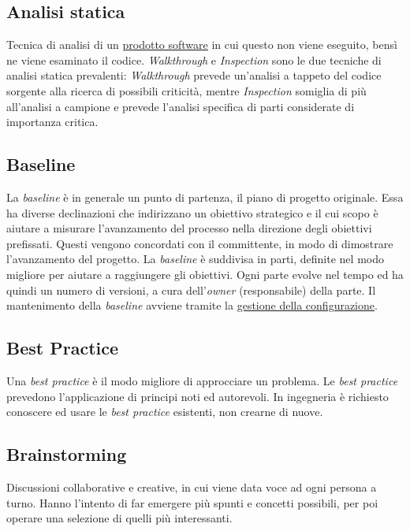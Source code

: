 	\subsection{Analisi statica}
	\label{sec:analisistatica}
	Tecnica di analisi di un \underline{\hyperref[sec:prodottosoftware]{prodotto software}} in cui questo non viene eseguito, bensì ne viene esaminato il codice.
	\emph{Walkthrough} e \emph{Inspection} sono le due tecniche di analisi statica prevalenti: \emph{Walkthrough} prevede un'analisi a tappeto del codice sorgente alla ricerca di possibili criticità, mentre \emph{Inspection} somiglia di più all'analisi a campione e prevede l'analisi specifica di parti considerate di importanza critica.
	\newpage
	\subsection{Baseline}
	\label{sec:baseline}
	La \emph{baseline} è in generale un punto di partenza, il piano di progetto originale. Essa ha diverse declinazioni che indirizzano un obiettivo strategico e il cui scopo è aiutare a misurare l'avanzamento del processo nella direzione degli obiettivi prefissati. Questi vengono concordati con il committente, in modo di dimostrare l'avanzamento del progetto. La  \emph{baseline} è suddivisa in parti, definite nel modo migliore per aiutare a raggiungere gli obiettivi. Ogni parte evolve nel tempo ed ha quindi un numero di versioni, a cura dell'\emph{owner} (responsabile) della parte. Il mantenimento della  \emph{baseline} avviene tramite la \underline{\hyperref[sec:controlloconfigurazione]{gestione della configurazione}}. 
	
	\subsection{Best Practice}
	\label{sec:bestpractice}
	Una \emph{best practice} è il modo migliore di approcciare un problema. Le \emph{best practice} prevedono l'applicazione di principi noti ed autorevoli. In ingegneria è richiesto conoscere ed usare le \emph{best practice} esistenti, non crearne di nuove.

	\subsection{Brainstorming}
	\label{sec:brainstorming}
	Discussioni collaborative e creative, in cui viene data voce ad ogni persona a turno. Hanno l'intento di far emergere più spunti e concetti possibili, per poi operare una selezione di quelli più interessanti. \newpage
	


